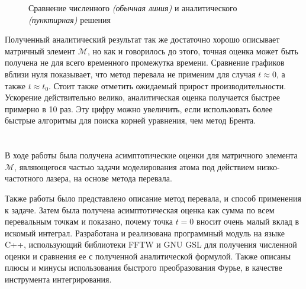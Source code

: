 \documentclass[14pt, a4paper]{article}
\numberwithin{figure}{section}
\numberwithin{equation}{section}
\newcommand{\sectionbreak}{\clearpage}
\newcommand{\cM}{\mathcal{M}}
\begin{document}
\begin{figure}[h]
	\caption{Сравнение численного \textit{(обычная линия)} и аналитического \textit{(пунктирная)} решения}
	\label{ris:end2}
\end{figure}

Полученный аналитический результат так же достаточно хорошо описывает матричный элемент $\cM$, но как и говорилось до этого, точная оценка может быть получена не для всего временного промежутка времени. Сравнение графиков вблизи нуля показывает, что метод перевала не применим для случая $t\approx 0$, а также $t\approx t_0$. 
Стоит также отметить ожидаемый прирост производительности. Ускорение действительно велико, аналитическая оценка получается быстрее примерно в 10 раз. Эту цифру можно увеличить, если использовать более быстрые алгоритмы для поиска корней уравнения, чем метод Брента.

\sectionbreak
\section*{}

В ходе работы была получена асимптотические оценки для матричного элемента $\cM$, являющегося частью задачи моделирования атома под действием низко-частотного лазера, на основе метода перевала. 

Также работы было представлено описание метод перевала, и способ применения к задаче. Затем была получена асимптотическая оценка как сумма по всем перевальным точкам и показано, почему точка $t = 0$ вносит очень малый вклад в искомый интеграл. Разработана и реализована программный модуль на языке C++, использующий библиотеки FFTW и GNU GSL для получения численной оценки и сравнения ее с полученной аналитической формулой. Также описаны плюсы и минусы использования быстрого преобразования Фурье, в качестве инструмента интегрирования.
\end{document}
